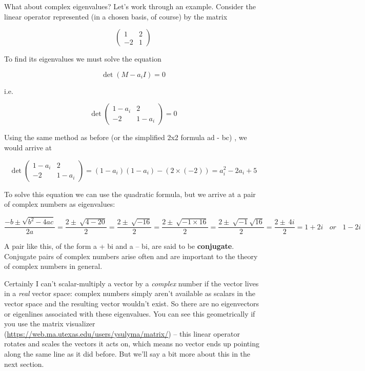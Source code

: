 \documentclass[oneside,english]{amsbook}
\numberwithin{section}{chapter}
\theoremstyle{plain}
\theoremstyle{definition}
\begin{document}
What about complex eigenvalues? Let's work through an example. Consider
the linear operator represented (in a chosen basis, of course) by the
matrix

\[\begin{pmatrix}
	1 & 2 \\
	- 2 & 1
\end{pmatrix}\]

To find its eigenvalues we must solve the equation

\[\det\left( M - a_{i}I \right) = 0\]

i.e.

\[\det\begin{pmatrix}
	1 - a_{i} & 2 \\
	- 2 & 1 - a_{i}
\end{pmatrix} = 0\]

Using the same method as before (or the simplified 2x2 formula ad - bc)
, we would arrive at

\[\det\begin{pmatrix}
	1 - a_{i} & 2 \\
	- 2 & 1 - a_{i}
\end{pmatrix} = \left( 1 - a_{i} \right)\left( 1 - a_{i} \right) - \left( 2 \times ( - 2) \right) = a_{i}^{2} - 2a_{i} + 5\]

To solve this equation we can use the quadratic formula, but we arrive
at a pair of complex numbers as eigenvalues:

\[{\frac{- b \pm \sqrt{b^{2} - 4ac}}{2a} = \frac{2 \pm \ \sqrt{4 - 20}}{2}
}{= \frac{2 \pm \ \sqrt{- 16}}{2}
}{= \frac{2 \pm \ \sqrt{- 1 \times 16}}{2}
}{= \frac{2 \pm \ \sqrt{- 1}\sqrt{16}}{2}
}{= \frac{2 \pm \ 4i}{2}
}{= 1 + 2i\ \ \ \ or\ \ \ \ 1 - 2i}\]

A pair like this, of the form a + bi and a -- bi, are said to be
\textbf{conjugate}. Conjugate pairs of complex numbers arise often and
are important to the theory of complex numbers in general.

Certainly I can't scalar-multiply a vector by a \emph{complex} number if
the vector lives in a \emph{real} vector space: complex numbers simply
aren't available as scalars in the vector space and the resulting vector
wouldn't exist. So there are no eigenvectors or eigenlines associated
with these eigenvalues. You can see this geometrically if you use the
matrix visualizer
(\url{https://web.ma.utexas.edu/users/ysulyma/matrix/}) -- this linear
operator rotates and scales the vectors it acts on, which means no
vector ends up pointing along the same line as it did before. But we'll
say a bit more about this in the next section.
\end{document}
